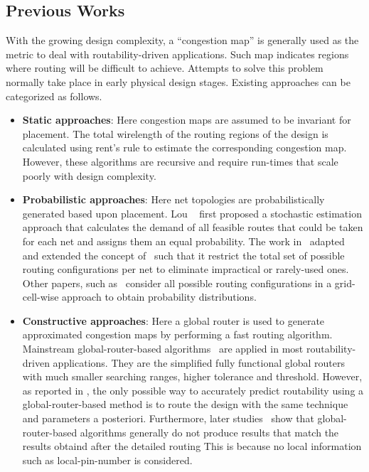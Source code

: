 \subsection{Previous Works}
With the growing design complexity, a ``congestion map'' is generally used as the metric to deal with routability-driven applications.
Such map indicates regions where routing will be difficult to achieve.
Attempts to solve this problem  normally take place in early physical design stages.
Existing approaches can be categorized as follows.
\begin{itemize}
\item \textbf{Static approaches}: Here congestion maps are assumed to be invariant  for placement. The total wirelength of the routing regions of the design is calculated using rent's rule \cite{rentsrule,rentsrulerecursive} to estimate the corresponding congestion map. However, these algorithms are recursive and require run-times that scale poorly with design complexity. 
\item \textbf{Probabilistic approaches}: Here net topologies are probabilistically generated based upon placement.  Lou \etal~\cite{first} first proposed a stochastic estimation approach that calculates the demand of all feasible routes that could be taken for each net and assigns them an equal probability. The work in~\cite{modeling} adapted and extended the concept of~\cite{first} such that it restrict the total set of possible routing configurations per net to eliminate impractical or rarely-used ones. Other papers, such as~\cite{SMD, 3step} consider all possible routing configurations in a grid-cell-wise approach to obtain probability distributions.
\item \textbf{Constructive approaches}: Here a global router is used to generate approximated congestion maps by performing a fast routing algorithm.  Mainstream global-router-based algorithms~\cite{mixedsizeplacement,ripple,simplr,nctufast,fastroute} are applied in most routability-driven applications. They are the simplified fully functional global routers with much smaller searching ranges, higher tolerance and threshold. However, as reported in \cite{fastroute}, the only possible way to accurately predict routability using  a global-router-based method is to route the design with the same technique and parameters a posteriori. Furthermore, later studies~\cite{study,ispd14,ispd15} show that global-router-based algorithms generally do not produce results that match the results obtaind after the detailed routing This is  because no local information such as local-pin-number is considered.

\end{itemize}
